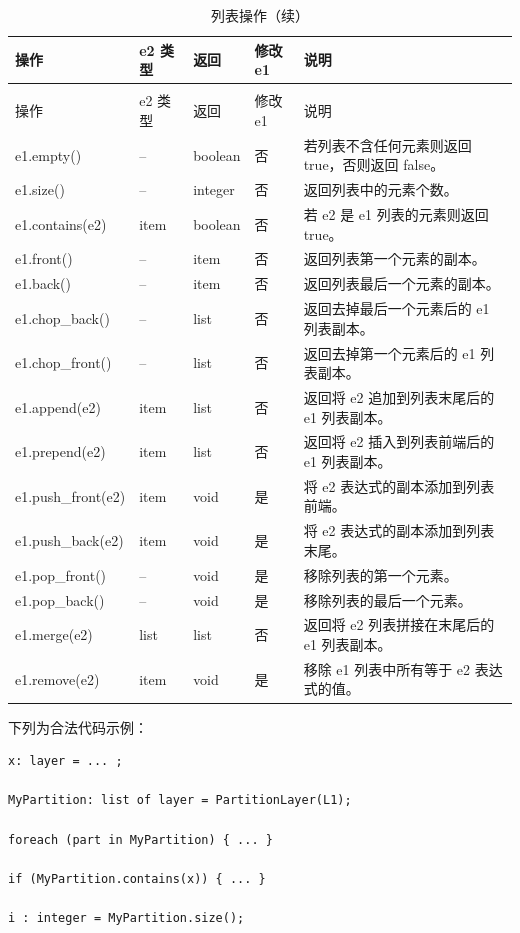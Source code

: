 \begin{longtable}{@{}>{\raggedright\arraybackslash\ttfamily}p{}
  >{\raggedright\arraybackslash}p{}
  >{\raggedright\arraybackslash}p{}
  >{\raggedright\arraybackslash}p{}
  p{}@{}}
\caption{列表操作}\label{tab:pxl-list-ops}\\
\toprule
操作 & e2 类型 & 返回 & 修改 e1 & 说明 \\
\midrule
\endfirsthead
\caption[]{列表操作（续）}\\
\toprule
操作 & e2 类型 & 返回 & 修改 e1 & 说明 \\
\midrule
\endhead
\bottomrule
\endfoot
e1.empty() & -- & boolean & 否 & 若列表不含任何元素则返回 true，否则返回 false。 \\
e1.size() & -- & integer & 否 & 返回列表中的元素个数。 \\
e1.contains(e2) & item & boolean & 否 & 若 e2 是 e1 列表的元素则返回 true。 \\
e1.front() & -- & item & 否 & 返回列表第一个元素的副本。 \\
e1.back() & -- & item & 否 & 返回列表最后一个元素的副本。 \\
e1.chop\_back() & -- & list & 否 & 返回去掉最后一个元素后的 e1 列表副本。 \\
e1.chop\_front() & -- & list & 否 & 返回去掉第一个元素后的 e1 列表副本。 \\
e1.append(e2) & item & list & 否 & 返回将 e2 追加到列表末尾后的 e1 列表副本。 \\
e1.prepend(e2) & item & list & 否 & 返回将 e2 插入到列表前端后的 e1 列表副本。 \\
e1.push\_front(e2) & item & void & 是 & 将 e2 表达式的副本添加到列表前端。 \\
e1.push\_back(e2) & item & void & 是 & 将 e2 表达式的副本添加到列表末尾。 \\
e1.pop\_front() & -- & void & 是 & 移除列表的第一个元素。 \\
e1.pop\_back() & -- & void & 是 & 移除列表的最后一个元素。 \\
e1.merge(e2) & list & list & 否 & 返回将 e2 列表拼接在末尾后的 e1 列表副本。 \\
e1.remove(e2) & item & void & 是 & 移除 e1 列表中所有等于 e2 表达式的值。 \\
\end{longtable}

下列为合法代码示例：
\begin{lstlisting}[style=pxl]
x: layer = ... ;

MyPartition: list of layer = PartitionLayer(L1);

foreach (part in MyPartition) { ... }

if (MyPartition.contains(x)) { ... }

i : integer = MyPartition.size();
\end{lstlisting}

